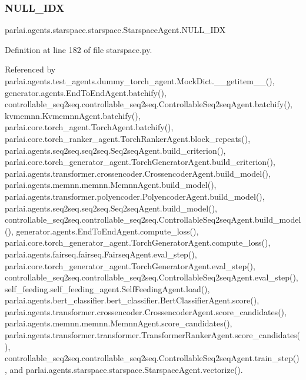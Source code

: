 \mbox{\label{classparlai_1_1agents_1_1starspace_1_1starspace_1_1StarspaceAgent_aee34a5667cc7acbeaacc5b9563487087}} 
\subsubsection{\texorpdfstring{N\+U\+L\+L\+\_\+\+I\+DX}{NULL\_IDX}}
{\footnotesize\ttfamily parlai.\+agents.\+starspace.\+starspace.\+Starspace\+Agent.\+N\+U\+L\+L\+\_\+\+I\+DX}



Definition at line 182 of file starspace.\+py.



Referenced by parlai.\+agents.\+test\+\_\+agents.\+dummy\+\_\+torch\+\_\+agent.\+Mock\+Dict.\+\_\+\+\_\+getitem\+\_\+\+\_\+(), generator.\+agents.\+End\+To\+End\+Agent.\+batchify(), controllable\+\_\+seq2seq.\+controllable\+\_\+seq2seq.\+Controllable\+Seq2seq\+Agent.\+batchify(), kvmemnn.\+Kvmemnn\+Agent.\+batchify(), parlai.\+core.\+torch\+\_\+agent.\+Torch\+Agent.\+batchify(), parlai.\+core.\+torch\+\_\+ranker\+\_\+agent.\+Torch\+Ranker\+Agent.\+block\+\_\+repeats(), parlai.\+agents.\+seq2seq.\+seq2seq.\+Seq2seq\+Agent.\+build\+\_\+criterion(), parlai.\+core.\+torch\+\_\+generator\+\_\+agent.\+Torch\+Generator\+Agent.\+build\+\_\+criterion(), parlai.\+agents.\+transformer.\+crossencoder.\+Crossencoder\+Agent.\+build\+\_\+model(), parlai.\+agents.\+memnn.\+memnn.\+Memnn\+Agent.\+build\+\_\+model(), parlai.\+agents.\+transformer.\+polyencoder.\+Polyencoder\+Agent.\+build\+\_\+model(), parlai.\+agents.\+seq2seq.\+seq2seq.\+Seq2seq\+Agent.\+build\+\_\+model(), controllable\+\_\+seq2seq.\+controllable\+\_\+seq2seq.\+Controllable\+Seq2seq\+Agent.\+build\+\_\+model(), generator.\+agents.\+End\+To\+End\+Agent.\+compute\+\_\+loss(), parlai.\+core.\+torch\+\_\+generator\+\_\+agent.\+Torch\+Generator\+Agent.\+compute\+\_\+loss(), parlai.\+agents.\+fairseq.\+fairseq.\+Fairseq\+Agent.\+eval\+\_\+step(), parlai.\+core.\+torch\+\_\+generator\+\_\+agent.\+Torch\+Generator\+Agent.\+eval\+\_\+step(), controllable\+\_\+seq2seq.\+controllable\+\_\+seq2seq.\+Controllable\+Seq2seq\+Agent.\+eval\+\_\+step(), self\+\_\+feeding.\+self\+\_\+feeding\+\_\+agent.\+Self\+Feeding\+Agent.\+load(), parlai.\+agents.\+bert\+\_\+classifier.\+bert\+\_\+classifier.\+Bert\+Classifier\+Agent.\+score(), parlai.\+agents.\+transformer.\+crossencoder.\+Crossencoder\+Agent.\+score\+\_\+candidates(), parlai.\+agents.\+memnn.\+memnn.\+Memnn\+Agent.\+score\+\_\+candidates(), parlai.\+agents.\+transformer.\+transformer.\+Transformer\+Ranker\+Agent.\+score\+\_\+candidates(), controllable\+\_\+seq2seq.\+controllable\+\_\+seq2seq.\+Controllable\+Seq2seq\+Agent.\+train\+\_\+step(), and parlai.\+agents.\+starspace.\+starspace.\+Starspace\+Agent.\+vectorize().

